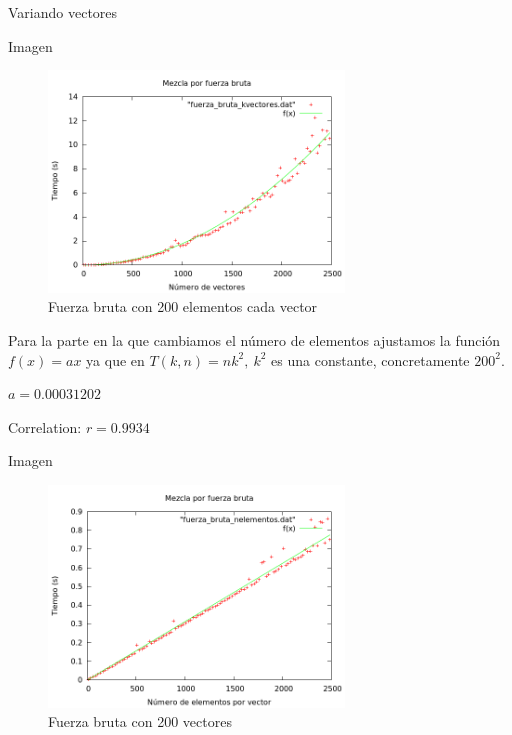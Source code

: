 \begin{frame}{Variando vectores}
	\begin{exampleblock}{Imagen}
	\begin{figure}[htb] 
	\centering
	\includegraphics[width=0.7\textwidth]														{../Obligatorio/Graficas/fuerza_bruta_kvectores.png}
	\caption{Fuerza bruta con 200 elementos cada vector} 
	\label{fig:f_kvectores} 
	\end{figure}
	\end{exampleblock}
\end{frame}

\begin{frame}
	\begin{block}
	
	Para la parte en la que cambiamos el n\'umero de elementos ajustamos la funci\'on 
	$f(x) = ax$ ya 	que en $T(k, n) = nk^2, \ k^2$ es una constante, concretamente 	$200^2$.

	\begin{center}
	$a               = 0.00031202$

	Correlation:  $r = 0.9934$
	\end{center}
	\end{block}
\end{frame}


\begin{frame}{Imagen}
	\begin{exampleblock}
	
	\begin{figure}[h] 
	\includegraphics[width=0.7\textwidth]
	{../Obligatorio/Graficas/fuerza_bruta_nelementos.png}
	\caption{Fuerza bruta con 200 vectores} 
	\end{figure}
	
	\end{exampleblock}
\end{frame}


